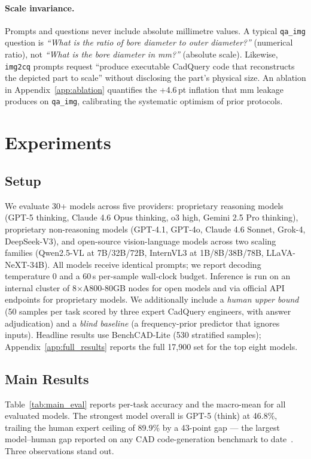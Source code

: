 \documentclass{article}
\begin{document}
\paragraph{Scale invariance.} Prompts and questions never include absolute millimetre values. A typical \texttt{qa\_img} question is \emph{``What is the ratio of bore diameter to outer diameter?''} (numerical ratio), not \emph{``What is the bore diameter in mm?''} (absolute scale). Likewise, \texttt{img2cq} prompts request ``produce executable CadQuery code that reconstructs the depicted part to scale'' without disclosing the part's physical size. An ablation in Appendix~\ref{app:ablation} quantifies the +4.6\,pt inflation that mm leakage produces on \texttt{qa\_img}, calibrating the systematic optimism of prior protocols.

\section{Experiments}
\label{sec:experiments}

\subsection{Setup}
We evaluate 30+ models across five providers: proprietary reasoning models (GPT-5 thinking, Claude 4.6 Opus thinking, o3 high, Gemini 2.5 Pro thinking), proprietary non-reasoning models (GPT-4.1, GPT-4o, Claude 4.6 Sonnet, Grok-4, DeepSeek-V3), and open-source vision-language models across two scaling families (Qwen2.5-VL at 7B/32B/72B, InternVL3 at 1B/8B/38B/78B, LLaVA-NeXT-34B). All models receive identical prompts; we report decoding temperature 0 and a 60\,s per-sample wall-clock budget. Inference is run on an internal cluster of 8$\times$A800-80GB nodes for open models and via official API endpoints for proprietary models. We additionally include a \emph{human upper bound} (50 samples per task scored by three expert CadQuery engineers, with answer adjudication) and a \emph{blind baseline} (a frequency-prior predictor that ignores inputs). Headline results use BenchCAD-Lite (530 stratified samples); Appendix~\ref{app:full_results} reports the full 17{,}900 set for the top eight models.

\subsection{Main Results}
\label{sec:exp_main}

Table~\ref{tab:main_eval} reports per-task accuracy and the macro-mean for all evaluated models. The strongest model overall is GPT-5 (think) at 46.8\%, trailing the human expert ceiling of 89.9\% by a 43-point gap --- the largest model--human gap reported on any CAD code-generation benchmark to date~\citep{Alrashedy2025,Guan2025}. Three observations stand out.
\end{document}
